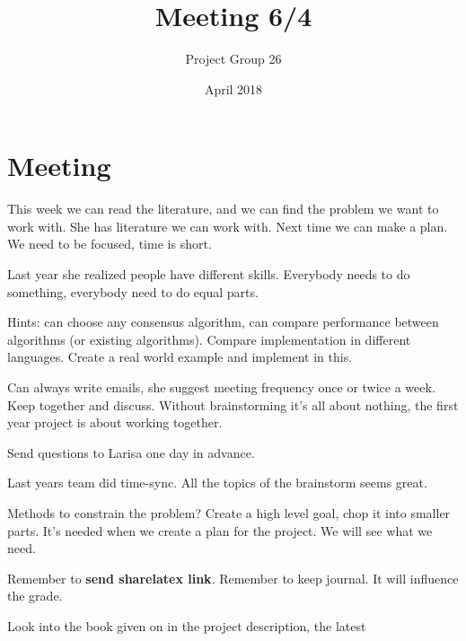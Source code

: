 \documentclass{article}
\title{Meeting 6/4}
\author{Project Group 26}
\date{April 2018}
\begin{document}
\maketitle

\section{Meeting}


This week  we can read the literature, and we can find the problem we want to work with. She has literature we can work with. Next time we can make a plan. We need to be focused, time is short. 

Last year she realized people have different skills. Everybody needs to do something, everybody need to do equal parts.

Hints: can choose any consensus algorithm, can compare performance between algorithms (or existing algorithms). Compare implementation in different languages. Create a real world example and implement in this.

Can always write emails, she suggest meeting frequency once or twice a week. Keep together and discuss. Without brainstorming it's all about nothing, the first year project is about working together. 

Send questions to Larisa one day in advance. 

Last years team did time-sync. All the topics of the brainstorm seems great. 

Methods to constrain the problem? Create a high level goal, chop it into smaller parts. It's needed when we create a plan for the project. We will see what we need.

Remember to \textbf{send sharelatex link}. Remember to keep journal. It will influence the grade.

Look into the book given on in the project description, the latest 
\end{document}
